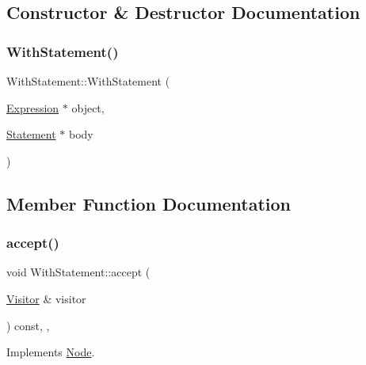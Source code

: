 \subsection{Constructor \& Destructor Documentation}
\mbox{\label{struct_with_statement_a30feda3f34febbab2584ea274fcd507d}} 
\subsubsection{\texorpdfstring{With\+Statement()}{WithStatement()}}
{\footnotesize\ttfamily With\+Statement\+::\+With\+Statement (\begin{DoxyParamCaption}\item[{\hyperlink{struct_expression}{Expression} $\ast$}]{object,  }\item[{\hyperlink{struct_statement}{Statement} $\ast$}]{body }\end{DoxyParamCaption})\hspace{0.3cm}{\ttfamily [inline]}}



\subsection{Member Function Documentation}
\mbox{\label{struct_with_statement_a07d3015de8ea5d3f27a0bab8719665f3}} 
\subsubsection{\texorpdfstring{accept()}{accept()}}
{\footnotesize\ttfamily void With\+Statement\+::accept (\begin{DoxyParamCaption}\item[{\hyperlink{struct_visitor}{Visitor} \&}]{visitor }\end{DoxyParamCaption}) const\hspace{0.3cm}{\ttfamily [inline]}, {\ttfamily [override]}, {\ttfamily [virtual]}}



Implements \hyperlink{struct_node_a10bd7af968140bbf5fa461298a969c71}{Node}.

\mbox{\label{struct_with_statement_ae26ccb907f2cbc302011c77c7b356ad1}} 
